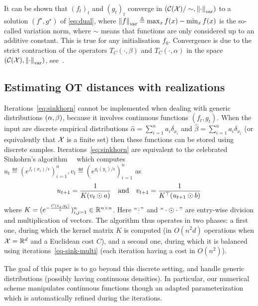 It can be shown that ${(f_t)}_t$ and ${(g_t)}_t$ converge in $(\mathcal{C}(\mathcal{X})/\sim,
\left\| \cdot \right\|_{\text{var}})$ to a solution $(f^\star, g^\star)$ of
\eqref{eq:dual}, where $\left\| f \right\|_{\text{var}} \triangleq \max_x f(x) - \min_x f(x)$ is
the so-called variation norm, where $\sim$ means that functions are only considered up to an additive constant. This is true for any initialisation $f_0$.  Convergence is due to the strict contraction of the operators $T_C(\cdot, \beta)$ and
$T_{C}(\cdot, \alpha)$ in the space $(\mathcal{C}(\mathcal{X}), \left\| \cdot \right\|_{\text{var}})$, see~\cite{peyre2019computational}.

\subsection{Estimating OT distances with realizations}

Iterations~\eqref{eq:sinkhorn} cannot be implemented when dealing with generic distributions $(\alpha,\beta)$, because it involves continuous functions $(f_t,g_t)$. 
%
When the input  are discrete empirical distributions $\hat \alpha = \sum_{i=1}^n a_i \delta_{x_i}$ and $\hat \beta =
\sum_{i=1}^n a_i \delta_{x_i}$ (or equivalently that $\mathcal{X}$ is a finite set) then these functions can be stored using discrete samples. Iterations~\eqref{eq:sinkhorn} are equivalent to the celebrated Sinkohrn's algorithm~~\cite{Sinkhorn64,sinkhorn1967concerning} which computes $u_t \eqdef (e^{f_t(x_i)/\epsilon})_{i=1}^n, v_t \eqdef (e^{g_t(y_i)/\epsilon})_{i=1}^n$ as
\begin{equation}\label{eq-sink-multi}
	u_{t+1} = \frac{1}{ K (v_t \odot a) }
	\quad \text{and} \quad
	v_{t+1} = \frac{1}{ K^\top (u_{t+1} \odot b) }
\end{equation}
where $K=(e^{-\frac{C(x_i,y_i)}{\varepsilon}})_{i,j=1}^n \in \mathbb{R}^{n \times n}$. Here $``\frac{\cdot}{\cdot}"$ and $``\cdot \odot \cdot"$ are entry-wise division and multiplication of vectors. The
algorithm thus operates in two phases: a first one, during which the kernel
matrix $K$ is computed (in $O(n^2 d)$ operations when $\mathcal{X}=\mathbb{R}^d$ and a Euclidean cost $C$), and a second one, during which it is balanced using iterations~\eqref{eq-sink-multi} (each iteration having a cost in $O(n^2)$).

The goal of this paper is to go beyond this discrete setting, and handle generic distributions (possibly having continuous densities). In particular, our numerical scheme manipulates continuous functions though an adapted parameterization which is automatically refined during the iterations.

